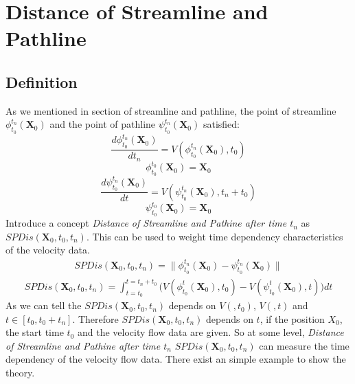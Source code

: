 \documentclass[
     11pt,         %
     a4paper,      %
     oneside,
     ]{article}
\newcommand{\vect}[1]{\boldsymbol{#1}}
\begin{document}
	\section{Distance of Streamline and Pathline}

	
   \subsection{Definition}
    As we mentioned in section of streamline and pathline, the point of streamline $\phi_{t_{0}}^{t_{n}}(\vect{X}_{0})$ and the point of pathline $\psi_{t_{0}}^{t_{n}}(\vect{X}_{0})$ satisfied:
    $$	\frac{d\phi_{t_{0}}^{t_{n}}(\vect{X}_{0})}{dt_{n}}=V(\phi_{t_{0}}^{t_{n}}(\vect{X}_{0}),t_{0})$$
    	$$\phi_{t_{0}}^{t_{0}}(\vect{X}_{0})=\vect{X}_{0}$$
    $$		\frac{d\psi_{t_{0}}^{t_{n}}(\vect{X}_{0})}{dt}=V(\psi_{t_{0}}^{t_{n}}(\vect{X}_{0}),t_{n}+t_{0})$$
    $$	\psi_{t_{0}}^{t_{0}}(\vect{X}_{0})=\vect{X}_{0}$$
	Introduce a concept \textit{Distance of Streamline and Pathine after time $t_{n}$} as \textbf{$SPDis(\vect{X}_{0},t_{0},t_{n})$}. This can be used to weight time dependency characteristics of the velocity data.
	\begin{eqnarray}
	SPDis(\vect{X}_{0},t_{0},t_{n})=\biggr\lVert\phi_{t_{0}}^{t_{n}}(\vect{X}_{0})-\psi_{t_{0}}^{t_{n}}(\vect{X}_{0})\biggr\rVert
	\end{eqnarray}
	\begin{eqnarray}
	SPDis(\vect{X}_{0},t_{0},t_{n})=\int_{t=t_{0}}^{t=t_{n}+t_{0}}\biggr( V(\phi_{t_{0}}^{t}(\vect{X}_{0}),t_{0})-V(\psi_{t_{0}}^{t}(\vect{X}_{0}),t)\biggr) dt
	\end{eqnarray}
    As we can tell the $SPDis(\vect{X}_{0},t_{0},t_{n})$ depends on $V(,t_{0})$, $V(,t)$ and $t\in [t_{0},t_{0}+t_{n}]$. Therefore $SPDis(\vect{X}_{0},t_{0},t_{n})$ depends on $t$, if the position $X_{0}$, the start time $t_{0}$ and the velocity flow data are given. So at some level, \textit{Distance of Streamline and Pathine after time $t_{n}$} $SPDis(\vect{X}_{0},t_{0},t_{n})$ can measure the time dependency of the velocity flow data. There exist an simple example to show the theory.
\end{document}
